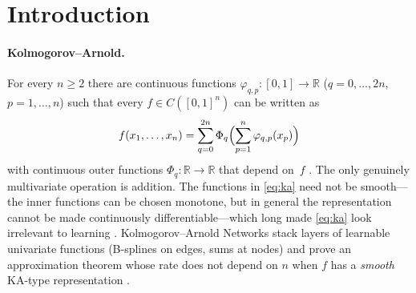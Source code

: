 \documentclass[11pt]{article}
\theoremstyle{definition}
\theoremstyle{remark}
\newcommand{\R}{\mathbb{R}}
\begin{document}
\begin{abstract}
Gaussian multi-view model whose target depends only on what the views share, and
categorization is sufficient whenever its cells shrink and stay few compared with the
sample and its smoothing vanishes fast enough, a requirement that grows with the dimension.  Tasks cannot be inferred locally---a sign construction makes a tree's
own data identical whether its input is necessary or irrelevant---but they can be
inferred consistently by verifying candidate tasks at the tree that composes them.  A cue
calculus maps associative, contextual, blocked and self-generated cues onto validities
of forest quantities and yields a procedure that designs a forest from held-out errors
alone.  The discrete cores of the statements are proved in Lean~4, an executable verifier
tests the statements against the implementation, and an independent reviewer, calibrated
on a copy with planted errors, audits the proofs.
\end{abstract}

\tableofcontents

\section{Introduction}

\paragraph{Kolmogorov--Arnold.}
For every $n\ge 2$ there are continuous functions $\varphi_{q,p}:[0,1]\to\R$
($q=0,\dots,2n$, $p=1,\dots,n$) such that every $f\in C([0,1]^n)$ can be written as
\begin{equation}\label{eq:ka}
  f(x_1,\dots,x_n)=\sum_{q=0}^{2n}\Phi_q\Bigl(\sum_{p=1}^{n}\varphi_{q,p}(x_p)\Bigr)
\end{equation}
with continuous outer functions $\Phi_q:\R\to\R$ that depend on~$f$
\citep{kolmogorov1957,arnold1957,lorentz1966,sprecher1965}.  The only genuinely
multivariate operation is addition.  The functions in \eqref{eq:ka} need not be
smooth---the inner functions can be chosen monotone, but in general the representation
cannot be made continuously differentiable---which long made \eqref{eq:ka} look
irrelevant to learning \citep{girosi1989}.  Kolmogorov--Arnold Networks \citep{liu2024kan} stack layers of
learnable univariate functions (B-splines on edges, sums at nodes) and prove an
approximation theorem whose rate does not depend on $n$ when $f$ has a \emph{smooth}
KA-type representation \citep[Thm.~2.1]{liu2024kan}.
\end{document}
